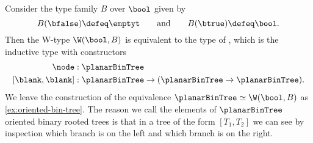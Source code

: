 \begin{eg}\label{eg:planar-binary-tree-W}
  Consider the type family $B$ over $\bool$ given by
  \begin{equation*}
    B(\bfalse) \defeq \emptyt \qquad\text{and}\qquad B(\btrue) \defeq \bool.
  \end{equation*}
  Then the W-type $\W(\bool,B)$ is equivalent to the type of , which is the inductive type with constructors
  \begin{align*}
    \node & : \planarBinTree \\
    {[\blank,\blank]} & : \planarBinTree\to (\planarBinTree \to \planarBinTree).
  \end{align*}
  We leave the construction of the equivalence $\planarBinTree\simeq\W(\bool,B)$ as \cref{ex:oriented-bin-tree}. The reason we call the elements of $\planarBinTree$ oriented binary rooted trees is that in a tree of the form $[T_1,T_2]$ we can see by inspection which branch is on the left and which branch is on the right.
\end{eg}

